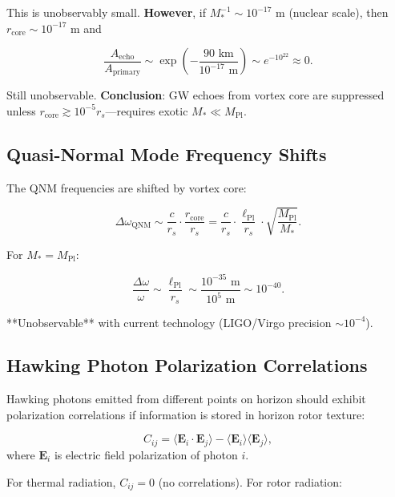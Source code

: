 \documentclass[11pt,a4paper]{article}
\numberwithin{equation}{section}
\theoremstyle{plain}
\theoremstyle{definition}
\theoremstyle{remark}
\begin{document}
This is unobservably small. \textbf{However}, if $M_*^{-1} \sim 10^{-17}$ m (nuclear scale), then $r_{\text{core}} \sim 10^{-17}$ m and

\begin{equation}
\frac{A_{\text{echo}}}{A_{\text{primary}}} \sim \exp\left(-\frac{90 \text{ km}}{10^{-17} \text{ m}}\right) \sim e^{-10^{22}} \approx 0.
\end{equation}

Still unobservable. \textbf{Conclusion}: GW echoes from vortex core are suppressed unless $r_{\text{core}} \gtrsim 10^{-5} r_s$—requires exotic $M_* \ll M_{\text{Pl}}$.

\subsection{Quasi-Normal Mode Frequency Shifts}

The QNM frequencies are shifted by vortex core:

\begin{equation}
\Delta\omega_{\text{QNM}} \sim \frac{c}{r_s} \cdot \frac{r_{\text{core}}}{r_s} = \frac{c}{r_s} \cdot \frac{\ell_{\text{Pl}}}{r_s} \cdot \sqrt{\frac{M_{\text{Pl}}}{M_*}}.
\end{equation}

For $M_* = M_{\text{Pl}}$:

\begin{equation}
\frac{\Delta\omega}{\omega} \sim \frac{\ell_{\text{Pl}}}{r_s} \sim \frac{10^{-35} \text{ m}}{10^5 \text{ m}} \sim 10^{-40}.
\end{equation}

**Unobservable** with current technology (LIGO/Virgo precision $\sim 10^{-4}$).

\subsection{Hawking Photon Polarization Correlations}

Hawking photons emitted from different points on horizon should exhibit polarization correlations if information is stored in horizon rotor texture:

\begin{equation}
C_{ij} = \langle \mathbf{E}_i \cdot \mathbf{E}_j \rangle - \langle \mathbf{E}_i \rangle \langle \mathbf{E}_j \rangle,
\end{equation}
where $\mathbf{E}_i$ is electric field polarization of photon $i$.

For thermal radiation, $C_{ij} = 0$ (no correlations). For rotor radiation:
\end{document}
